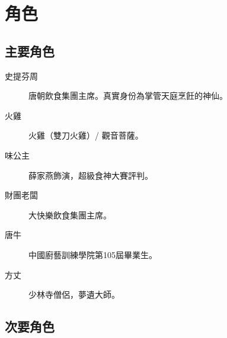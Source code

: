 
\chapter{角色}

\section*{主要角色}

\begin{description}
\item[史提芬周] 唐朝飲食集團主席。真實身份為掌管天庭烹飪的神仙。
\item[火雞] 火雞（雙刀火雞）/ 觀音菩薩。
\item[味公主] 薛家燕飾演，超級食神大賽評判。
\item[財團老闆] 大快樂飲食集團主席。
\item[唐牛] 中國廚藝訓練學院第105屆畢業生。
\item[方丈] 少林寺僧侶，夢遺大師。
\end{description}

\section*{次要角色}

